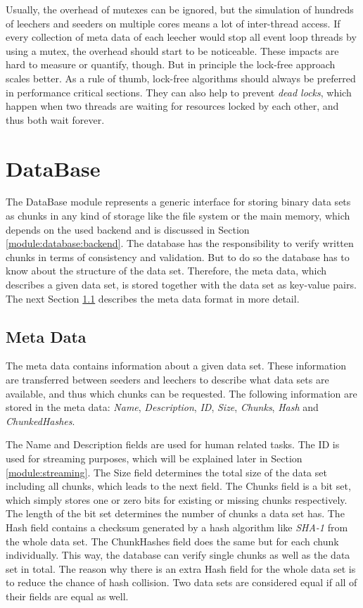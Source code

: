 Usually, the overhead of mutexes can be ignored, but the simulation of hundreds of leechers and seeders on multiple cores means a lot of inter-thread access. If every collection of meta data of each leecher would stop all event loop threads by using a mutex, the overhead should start to be noticeable. These impacts are hard to measure or quantify, though. But in principle the lock-free approach scales better. As a rule of thumb, lock-free algorithms should always be preferred in performance critical sections. They can also help to prevent \emph{dead locks}, which happen when two threads are waiting for resources locked by each other, and thus both wait forever.


\section{DataBase}
\label{module:database}
The DataBase module represents a generic interface for storing binary data sets as chunks in any kind of storage like the file system or the main memory, which depends on the used backend and is discussed in Section \ref{module:database:backend}. The database has the responsibility to verify written chunks in terms of consistency and validation. But to do so the database has to know about the structure of the data set. Therefore, the meta data, which describes a given data set, is stored together with the data set as key-value pairs. The next Section \ref{module:database:metadata} describes the meta data format in more detail.


\subsection{Meta Data}
\label{module:database:metadata}
The meta data contains information about a given data set. These information are transferred between seeders and leechers to describe what data sets are available, and thus which chunks can be requested. The following information are stored in the meta data: \emph{Name}, \emph{Description}, \emph{ID}, \emph{Size}, \emph{Chunks}, \emph{Hash} and \emph{ChunkedHashes}.

The Name and Description fields are used for human related tasks. The ID is used for streaming purposes, which will be explained later in Section \ref{module:streaming}. The Size field determines the total size of the data set including all chunks, which leads to the next field. The Chunks field is a bit set, which simply stores one or zero bits for existing or missing chunks respectively. The length of the bit set determines the number of chunks a data set has. The Hash field contains a checksum generated by a hash algorithm like \emph{SHA-1} from the whole data set. The ChunkHashes field does the same but for each chunk individually. This way, the database can verify single chunks as well as the data set in total. The reason why there is an extra Hash field for the whole data set is to reduce the chance of hash collision. Two data sets are considered equal if all of their fields are equal as well.


